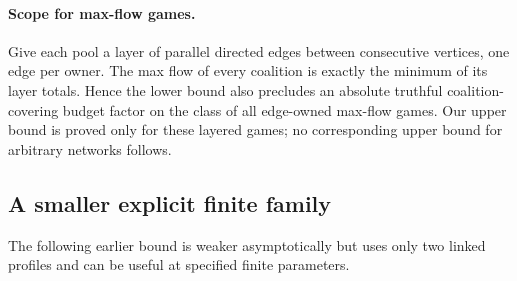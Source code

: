 \documentclass[11pt]{article}
\theoremstyle{definition}\newtheorem{definition}[theorem]{Definition}
\theoremstyle{remark}\newtheorem{remark}[theorem]{Remark}
\begin{document}
\paragraph{Scope for max-flow games.}
Give each pool a layer of parallel directed edges between consecutive
vertices, one edge per owner. The max flow of every coalition is exactly
the minimum of its layer totals. Hence the lower bound also precludes an
absolute truthful coalition-covering budget factor on the class of all
edge-owned max-flow games. Our upper bound is proved only for these layered
games; no corresponding upper bound for arbitrary networks follows.

\subsection{A smaller explicit finite family}
The following earlier bound is weaker asymptotically but uses only two
linked profiles and can be useful at specified finite parameters.
\end{document}
